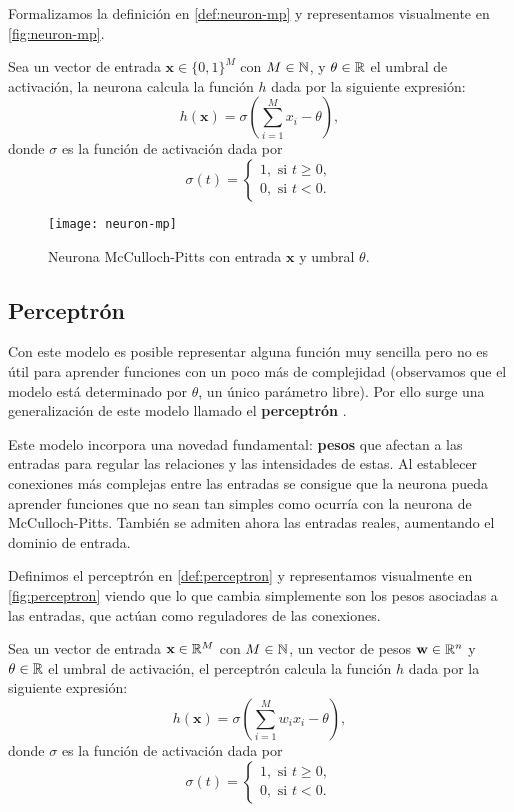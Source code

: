 Formalizamos la definición en \autoref{def:neuron-mp} y representamos visualmente en \autoref{fig:neuron-mp}.

\begin{definicion}
  Sea un vector de entrada $\textbf{x} \in \{0, 1\}^M$ con $M \in \mathbb{N}$, y $\theta \in \mathbb{R}$ el umbral de activación, la neurona calcula la función $h$ dada por la siguiente expresión:
  $$ h(\textbf{x}) = \sigma\left(\sum \limits^M_{i = 1} x_i - \theta\right),$$
  donde $\sigma$ es la función de activación dada por $$\sigma(t) = \begin{cases} 1, \text{ si } t \geq 0, \\ 0, \text{ si } t < 0. \end{cases}$$
  \label{def:neuron-mp}
\end{definicion}

\begin{figure}[htpb]
  \centering
  \texttt{[image: neuron-mp]}
  \caption{Neurona McCulloch-Pitts con entrada $\textbf{x}$ y umbral $\theta$.}
  \label{fig:neuron-mp}
\end{figure}

\subsection{Perceptrón}

Con este modelo es posible representar alguna función muy sencilla pero no es útil para aprender funciones con un poco más de complejidad (observamos que el modelo está determinado por $\theta$, un único parámetro libre). Por ello surge una generalización de este modelo llamado el \textbf{perceptrón} \cite{rosenblatt1958perceptron}.

Este modelo incorpora una novedad fundamental: \textbf{pesos} que afectan a las entradas para regular las relaciones y las intensidades de estas. Al establecer conexiones más complejas entre las entradas se consigue que la neurona pueda aprender funciones que no sean tan simples como ocurría con la neurona de McCulloch-Pitts. También se admiten ahora las entradas reales, aumentando el dominio de entrada.

Definimos el perceptrón en \autoref{def:perceptron} y representamos visualmente en \autoref{fig:perceptron} viendo que lo que cambia simplemente son los pesos asociadas a las entradas, que actúan como reguladores de las conexiones.

\begin{definicion}[Perceptrón]
  Sea un vector de entrada $\textbf{x} \in \mathbb{R}^M$ con $M \in \mathbb{N}$, un vector de pesos $\textbf{w} \in \mathbb{R}^n$ y $\theta \in \mathbb{R}$ el umbral de activación, el perceptrón calcula la función $h$ dada por la siguiente expresión:
  $$h(\textbf{x}) = \sigma\left(\sum \limits^M_{i = 1}w_i x_i - \theta\right),$$
  donde $\sigma$ es la función de activación dada por $$\sigma(t) = \begin{cases} 1, \text{ si } t \geq 0, \\ 0, \text{ si } t < 0. \end{cases}$$
  \label{def:perceptron}
\end{definicion}

